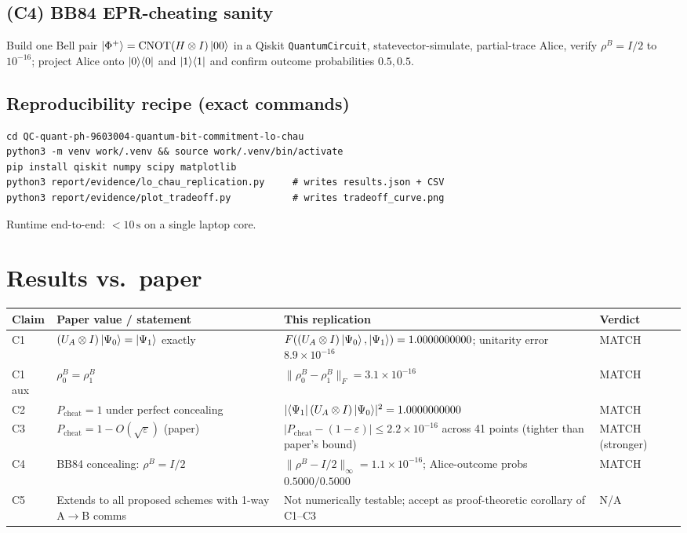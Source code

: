 \documentclass[11pt]{article}
\begin{document}
\subsection{(C4) BB84 EPR-cheating sanity}
Build one Bell pair $\ket{\Phi^+}=\text{CNOT}(H\otimes I)\ket{00}$ in a
Qiskit \texttt{QuantumCircuit}, statevector-simulate, partial-trace Alice,
verify $\rho^B=I/2$ to $10^{-16}$; project Alice onto $\ket{0}\!\bra{0}$
and $\ket{1}\!\bra{1}$ and confirm outcome probabilities $0.5,0.5$.

\subsection{Reproducibility recipe (exact commands)}
\begin{lstlisting}
cd QC-quant-ph-9603004-quantum-bit-commitment-lo-chau
python3 -m venv work/.venv && source work/.venv/bin/activate
pip install qiskit numpy scipy matplotlib
python3 report/evidence/lo_chau_replication.py     # writes results.json + CSV
python3 report/evidence/plot_tradeoff.py           # writes tradeoff_curve.png
\end{lstlisting}
Runtime end-to-end: $<10\,\text{s}$ on a single laptop core.

\section{Results vs.\ paper}

\begin{center}
\begin{tabular}{@{}p{2.2cm}p{4.4cm}p{4.0cm}p{2.6cm}@{}}
\toprule
Claim & Paper value / statement & This replication & Verdict \\\midrule
C1 & $(U_A\otimes I)\ket{\Psi_0}=\ket{\Psi_1}$ exactly &
     $F((U_A\otimes I)\ket{\Psi_0},\ket{\Psi_1})=1.0000000000$;
     unitarity error $8.9\!\times\!10^{-16}$ & MATCH \\
C1 aux & $\rho^B_0=\rho^B_1$ &
     $\|\rho^B_0-\rho^B_1\|_F = 3.1\!\times\!10^{-16}$ & MATCH \\
C2 & $P_\mathrm{cheat}=1$ under perfect concealing &
     $|\!\bra{\Psi_1}(U_A\otimes I)\ket{\Psi_0}\!|^2 = 1.0000000000$ &
     MATCH \\
C3 & $P_\mathrm{cheat}=1-O(\sqrt\varepsilon)$ (paper) &
     $|P_\mathrm{cheat}-(1-\varepsilon)|\le 2.2\!\times\!10^{-16}$ across 41
     points (tighter than paper's bound) & MATCH (stronger) \\
C4 & BB84 concealing: $\rho^B=I/2$ &
     $\|\rho^B-I/2\|_\infty = 1.1\!\times\!10^{-16}$;
     Alice-outcome probs $0.5000/0.5000$ & MATCH \\
C5 & Extends to all proposed schemes with 1-way A$\to$B comms &
     Not numerically testable; accept as proof-theoretic corollary of
     C1--C3 & N/A \\\bottomrule
\end{tabular}
\end{center}
\end{document}
